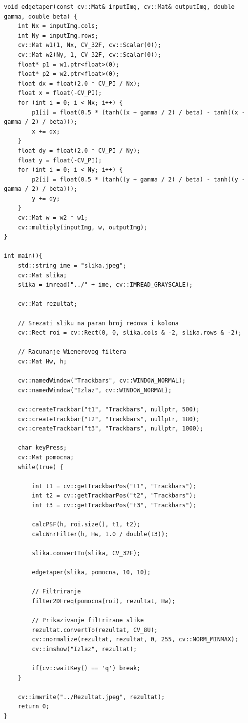 \documentclass[a4paper, 12pt]{article}
\begin{document}
\begin{lstlisting}
void edgetaper(const cv::Mat& inputImg, cv::Mat& outputImg, double gamma, double beta) {
    int Nx = inputImg.cols;
    int Ny = inputImg.rows;
    cv::Mat w1(1, Nx, CV_32F, cv::Scalar(0));
    cv::Mat w2(Ny, 1, CV_32F, cv::Scalar(0));
    float* p1 = w1.ptr<float>(0);
    float* p2 = w2.ptr<float>(0);
    float dx = float(2.0 * CV_PI / Nx);
    float x = float(-CV_PI);
    for (int i = 0; i < Nx; i++) {
        p1[i] = float(0.5 * (tanh((x + gamma / 2) / beta) - tanh((x - gamma / 2) / beta)));
        x += dx;
    }
    float dy = float(2.0 * CV_PI / Ny);
    float y = float(-CV_PI);
    for (int i = 0; i < Ny; i++) {
        p2[i] = float(0.5 * (tanh((y + gamma / 2) / beta) - tanh((y - gamma / 2) / beta)));
        y += dy;
    }
    cv::Mat w = w2 * w1;
    cv::multiply(inputImg, w, outputImg);
}

int main(){
    std::string ime = "slika.jpeg";
    cv::Mat slika;
    slika = imread("../" + ime, cv::IMREAD_GRAYSCALE);

    cv::Mat rezultat;

    // Srezati sliku na paran broj redova i kolona
    cv::Rect roi = cv::Rect(0, 0, slika.cols & -2, slika.rows & -2);

    // Racunanje Wienerovog filtera
    cv::Mat Hw, h;

    cv::namedWindow("Trackbars", cv::WINDOW_NORMAL);
    cv::namedWindow("Izlaz", cv::WINDOW_NORMAL);

    cv::createTrackbar("t1", "Trackbars", nullptr, 500);
    cv::createTrackbar("t2", "Trackbars", nullptr, 180);
    cv::createTrackbar("t3", "Trackbars", nullptr, 1000);

    char keyPress;
    cv::Mat pomocna;
    while(true) {
        
        int t1 = cv::getTrackbarPos("t1", "Trackbars");
        int t2 = cv::getTrackbarPos("t2", "Trackbars");
        int t3 = cv::getTrackbarPos("t3", "Trackbars");

        calcPSF(h, roi.size(), t1, t2);
        calcWnrFilter(h, Hw, 1.0 / double(t3));

        slika.convertTo(slika, CV_32F);

        edgetaper(slika, pomocna, 10, 10);

        // Filtriranje
        filter2DFreq(pomocna(roi), rezultat, Hw);

        // Prikazivanje filtrirane slike
        rezultat.convertTo(rezultat, CV_8U);
        cv::normalize(rezultat, rezultat, 0, 255, cv::NORM_MINMAX);
        cv::imshow("Izlaz", rezultat);

        if(cv::waitKey() == 'q') break;
    }

    cv::imwrite("../Rezultat.jpeg", rezultat);
    return 0;
}
\end{lstlisting}
\end{document}
